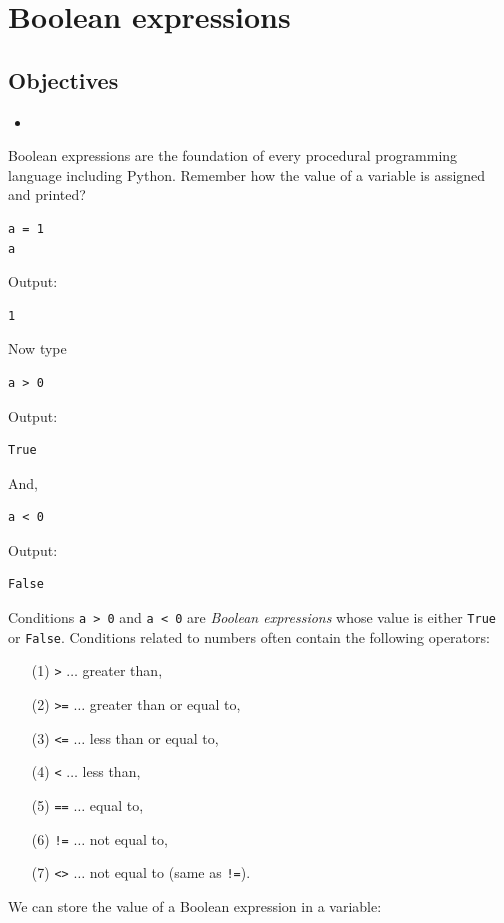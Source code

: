 \documentclass[article,A4,12pt]{llncs}
\begin{document}
\section{Boolean expressions}

\subsection{Objectives}

\begin{itemize}
\item
\end{itemize}

Boolean expressions are the foundation of every procedural programming 
language including Python. Remember how the value of a variable 
is assigned and printed? 

\begin{verbatim}
a = 1
a
\end{verbatim}
Output:

\begin{verbatim}
1
\end{verbatim}
Now type

\begin{verbatim}
a > 0
\end{verbatim}
Output:

\begin{verbatim}
True
\end{verbatim}
And,

\begin{verbatim}
a < 0
\end{verbatim}
Output:

\begin{verbatim}
False
\end{verbatim}
Conditions {\tt a > 0} and {\tt a < 0} are {\em Boolean expressions} whose value is either 
{\tt True} or {\tt False}. Conditions related to numbers often contain the following operators:

\begin{itemize}
\item[(1)] {\tt >} {$\ldots$} greater than, 
\item[(2)] {\tt >=} {$\ldots$} greater than or equal to, 
\item[(3)] {\tt <=} {$\ldots$} less than or equal to, 
\item[(4)] {\tt <} {$\ldots$} less than, 
\item[(5)] {\tt ==} {$\ldots$} equal to, 
\item[(6)] {\tt !=} {$\ldots$} not equal to, 
\item[(7)] {\tt <>} {$\ldots$} not equal to (same as {\tt !=}).
\end{itemize}
We can store the value of a Boolean expression in a variable:
\end{document}
